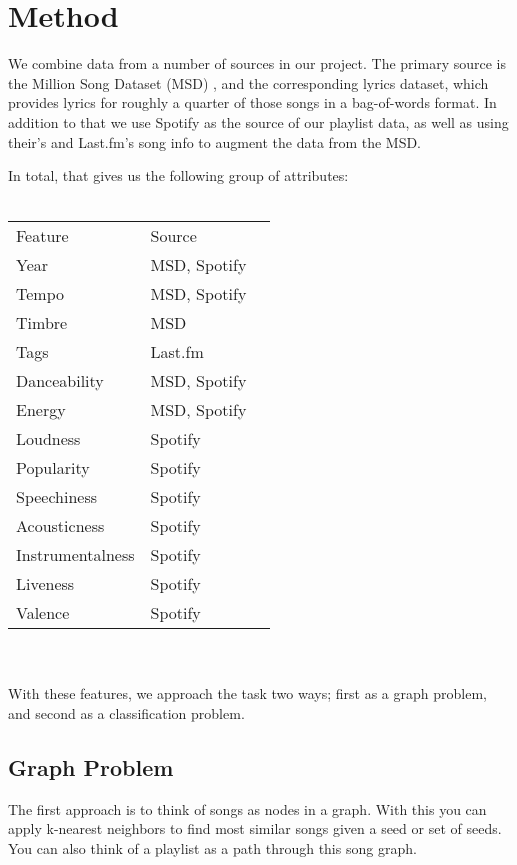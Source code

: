 \documentclass[10pt,journal,compsoc]{IEEEtran}
\begin{document}
\section{Method}
We combine data from a number of sources in our project. The primary source is the Million Song Dataset (MSD) \cite{msd}, and the corresponding lyrics dataset, which provides lyrics for roughly a quarter of those songs in a bag-of-words format. In addition to that we use Spotify \cite{spotify} as the source of our playlist data, as well as using their's and Last.fm's \cite{lastfm} song info to augment the data from the MSD.

In total, that gives us the following group of attributes:
\\\\
\begin{tabular}{lll}
Feature           & Source          \\
Year              & MSD, Spotify    \\
Tempo             & MSD, Spotify    \\
Timbre            & MSD             \\
Tags              & Last.fm         \\
Danceability      & MSD, Spotify    \\
Energy            & MSD, Spotify    \\
Loudness          & Spotify         \\
Popularity        & Spotify         \\
Speechiness       & Spotify         \\
Acousticness      & Spotify         \\
Instrumentalness  & Spotify         \\
Liveness          & Spotify         \\
Valence           & Spotify         \\

\end{tabular}
\\\\
With these features, we approach the task two ways; first as a graph problem, and second as a classification problem.

\subsection{Graph Problem}
The first approach is to think of songs as nodes in a graph. With this you can apply k-nearest neighbors to find most similar songs given a seed or set of seeds. You can also think of a playlist as a path through this song graph. \cite{Alghoniemy01anetwork}
\end{document}
